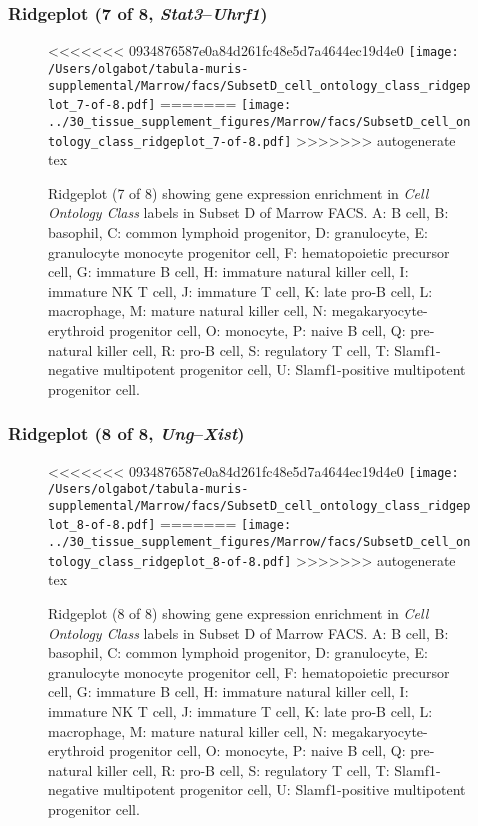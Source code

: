 \clearpage

\subsubsection{Ridgeplot (7 of 8, \emph{Stat3}--\emph{Uhrf1})}
\begin{figure}[h]
\centering
<<<<<<< 0934876587e0a84d261fc48e5d7a4644ec19d4e0
\texttt{[image: /Users/olgabot/tabula-muris-supplemental/Marrow/facs/SubsetD\_cell\_ontology\_class\_ridgeplot\_7-of-8.pdf]}
=======
\texttt{[image: ../30\_tissue\_supplement\_figures/Marrow/facs/SubsetD\_cell\_ontology\_class\_ridgeplot\_7-of-8.pdf]}
>>>>>>> autogenerate tex

\caption{ Ridgeplot (7 of 8)  showing gene expression enrichment in \emph{Cell Ontology Class} labels in Subset D of Marrow FACS. A: B cell, B: basophil, C: common lymphoid progenitor, D: granulocyte, E: granulocyte monocyte progenitor cell, F: hematopoietic precursor cell, G: immature B cell, H: immature natural killer cell, I: immature NK T cell, J: immature T cell, K: late pro-B cell, L: macrophage, M: mature natural killer cell, N: megakaryocyte-erythroid progenitor cell, O: monocyte, P: naive B cell, Q: pre-natural killer cell, R: pro-B cell, S: regulatory T cell, T: Slamf1-negative multipotent progenitor cell, U: Slamf1-positive multipotent progenitor cell.}
\end{figure}


\clearpage

\subsubsection{Ridgeplot (8 of 8, \emph{Ung}--\emph{Xist})}
\begin{figure}[h]
\centering
<<<<<<< 0934876587e0a84d261fc48e5d7a4644ec19d4e0
\texttt{[image: /Users/olgabot/tabula-muris-supplemental/Marrow/facs/SubsetD\_cell\_ontology\_class\_ridgeplot\_8-of-8.pdf]}
=======
\texttt{[image: ../30\_tissue\_supplement\_figures/Marrow/facs/SubsetD\_cell\_ontology\_class\_ridgeplot\_8-of-8.pdf]}
>>>>>>> autogenerate tex

\caption{ Ridgeplot (8 of 8)  showing gene expression enrichment in \emph{Cell Ontology Class} labels in Subset D of Marrow FACS. A: B cell, B: basophil, C: common lymphoid progenitor, D: granulocyte, E: granulocyte monocyte progenitor cell, F: hematopoietic precursor cell, G: immature B cell, H: immature natural killer cell, I: immature NK T cell, J: immature T cell, K: late pro-B cell, L: macrophage, M: mature natural killer cell, N: megakaryocyte-erythroid progenitor cell, O: monocyte, P: naive B cell, Q: pre-natural killer cell, R: pro-B cell, S: regulatory T cell, T: Slamf1-negative multipotent progenitor cell, U: Slamf1-positive multipotent progenitor cell.}
\end{figure}


